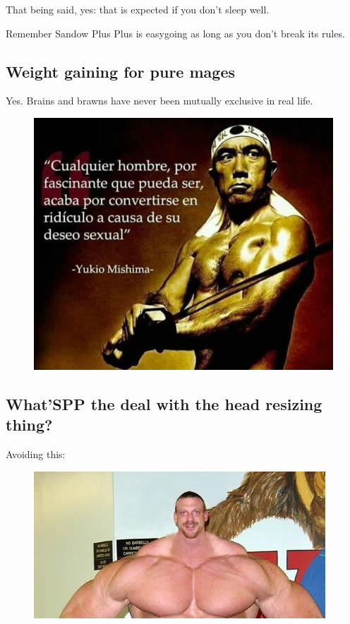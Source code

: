 \documentclass[11pt]{article}
\newlength{\imgMed}
\begin{document}
That being said, yes: that is expected if you don't sleep well. 

Remember Sandow Plus Plus is easygoing as long as you don't break its rules.

\subsection{Weight gaining for pure mages}
Yes. Brains and brawns have never been mutually exclusive in real life.
\begin{figure}[H]
    \centering
    \includegraphics[width=\imgMed]{mishima}
    \label{fig:mishima}
\end{figure}

\subsection{What'SPP the deal with the head resizing thing?}
Avoiding this:

\begin{figure}[H]
    \centering
    \includegraphics[width=\imgMed]{meme-head}
    \label{fig:meme-head}
\end{figure}
\end{document}
